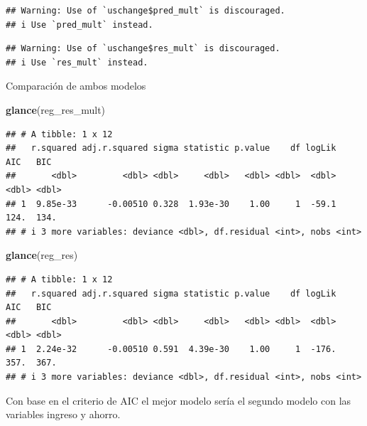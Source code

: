 \documentclass[
]{article}
\newenvironment{Shaded}{\begin{snugshade}}{\end{snugshade}}
\newcommand{\FunctionTok}[1]{\textcolor[rgb]{0.13,0.29,0.53}{\textbf{#1}}}
\newcommand{\NormalTok}[1]{#1}
\begin{document}
\begin{verbatim}
## Warning: Use of `uschange$pred_mult` is discouraged.
## i Use `pred_mult` instead.
\end{verbatim}

\begin{verbatim}
## Warning: Use of `uschange$res_mult` is discouraged.
## i Use `res_mult` instead.
\end{verbatim}


Comparación de ambos modelos

\begin{Shaded}
\begin{Highlighting}[]
\FunctionTok{glance}\NormalTok{(reg\_res\_mult)}
\end{Highlighting}
\end{Shaded}

\begin{verbatim}
## # A tibble: 1 x 12
##   r.squared adj.r.squared sigma statistic p.value    df logLik   AIC   BIC
##       <dbl>         <dbl> <dbl>     <dbl>   <dbl> <dbl>  <dbl> <dbl> <dbl>
## 1  9.85e-33      -0.00510 0.328  1.93e-30    1.00     1  -59.1  124.  134.
## # i 3 more variables: deviance <dbl>, df.residual <int>, nobs <int>
\end{verbatim}

\begin{Shaded}
\begin{Highlighting}[]
\FunctionTok{glance}\NormalTok{(reg\_res)}
\end{Highlighting}
\end{Shaded}

\begin{verbatim}
## # A tibble: 1 x 12
##   r.squared adj.r.squared sigma statistic p.value    df logLik   AIC   BIC
##       <dbl>         <dbl> <dbl>     <dbl>   <dbl> <dbl>  <dbl> <dbl> <dbl>
## 1  2.24e-32      -0.00510 0.591  4.39e-30    1.00     1  -176.  357.  367.
## # i 3 more variables: deviance <dbl>, df.residual <int>, nobs <int>
\end{verbatim}

Con base en el criterio de AIC el mejor modelo sería el segundo modelo
con las variables ingreso y ahorro.
\end{document}
